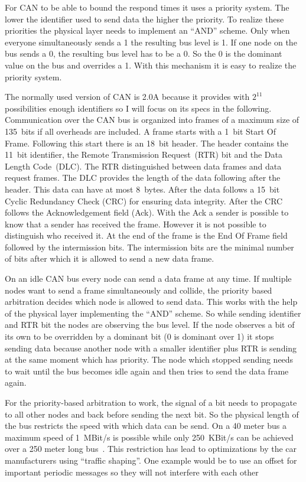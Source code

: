 For CAN to be able to bound the respond times it uses a priority system. The
lower the identifier used to send data the higher the priority. To realize these
priorities the physical layer needs to implement an ``AND'' scheme. Only when
everyone simultaneously sends a 1 the resulting bus level is 1. If one node on
the bus sends a 0, the resulting bus level has to be a 0. So the 0 is the
dominant value on the bus and overrides a 1. With this mechanism it is easy to
realize the priority system.

The normally used version of CAN is 2.0A because it provides with \(2^{11}\)
possibilities enough identifiers so I will focus on its specs in the following.
Communication over the CAN bus is organized into frames of a maximum size of
135~bits if all overheads are included. A frame starts with a 1~bit Start Of
Frame. Following this start there is an 18~bit header. The header contains the
11~bit identifier, the Remote Transmission Request~(RTR) bit and the Data Length
Code~(DLC). The RTR distinguished between data frames and data request frames.
The DLC provides the length of the data following after the header. This data
can have at most 8~bytes. After the data follows a 15~bit Cyclic Redundancy
Check (CRC) for ensuring data integrity. After the CRC follows the
Acknowledgement field (Ack). With the Ack a sender is possible to know that a
sender has received the frame. However it is not possible to distinguish who
received it. At the end of the frame is the End Of Frame field followed by the
intermission bits. The intermission bits are the minimal number of bits after
which it is allowed to send a new data frame.

On an idle CAN bus every node can send a data frame at any time. If multiple
nodes want to send a frame simultaneously and collide, the priority based
arbitration decides which node is allowed to send data. This works with the help
of the physical layer implementing the ``AND'' scheme. So while sending
identifier and RTR bit the nodes are observing the bus level. If the node
observes a bit of its own to be overridden by a dominant bit (0 is dominant over
1) it stops sending data because another node with a smaller identifier plus RTR
is sending at the same moment which has priority. The node which stopped sending
needs to wait until the bus becomes idle again and then tries to send the data
frame again.

For the priority-based arbitration to work, the signal of a bit needs to
propagate to all other nodes and back before sending the next bit. So the
physical length of the bus restricts the speed with which data can be send. On a
40 meter bus a maximum speed of 1~MBit/s is possible while only 250~KBit/s can
be achieved over a 250 meter long bus~\cite{Navet2017}. This restriction has
lead to optimizations by the car manufacturers using ``traffic shaping''. One
example would be to use an offset for important periodic messages so they will
not interfere with each other~\cite{Navet2009}

